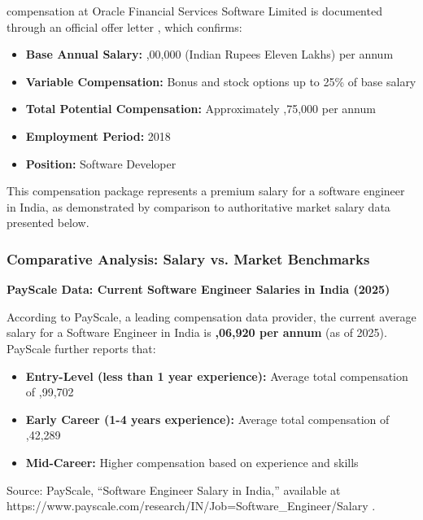 \drs compensation at Oracle Financial Services Software Limited is documented through an official offer letter \cite{SAL1}, which confirms:

\begin{itemize}
    \item \textbf{Base Annual Salary:} ,00,000 (Indian Rupees Eleven Lakhs) per annum
    \item \textbf{Variable Compensation:} Bonus and stock options up to 25\% of base salary
    \item \textbf{Total Potential Compensation:} Approximately ,75,000 per annum
    \item \textbf{Employment Period:} 2018
    \item \textbf{Position:} Software Developer
\end{itemize}

This compensation package represents a premium salary for a software engineer in India, as demonstrated by comparison to authoritative market salary data presented below.


\subsubsection{Comparative Analysis: \drs Salary vs. Market Benchmarks}
\label{salary:comparison}

\textbf{PayScale Data: Current Software Engineer Salaries in India (2025)}

According to PayScale, a leading compensation data provider, the current average salary for a Software Engineer in India is \textbf{,06,920 per annum} (as of 2025). PayScale further reports that:

\begin{itemize}
    \item \textbf{Entry-Level (less than 1 year experience):} Average total compensation of ,99,702
    \item \textbf{Early Career (1-4 years experience):} Average total compensation of ,42,289
    \item \textbf{Mid-Career:} Higher compensation based on experience and skills
\end{itemize}

Source: PayScale, ``Software Engineer Salary in India,'' available at https://www.payscale.com/research/IN/Job=Software\_Engineer/Salary \cite{SAL2}.

